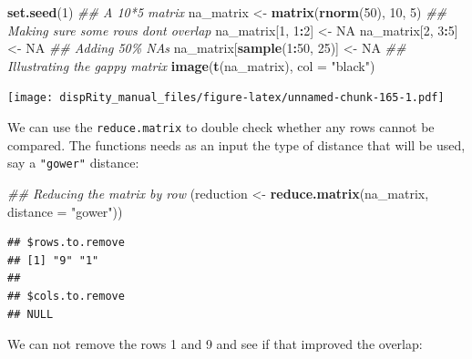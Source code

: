 \documentclass[
]{book}
\newenvironment{Shaded}{\begin{snugshade}}{\end{snugshade}}
\newcommand{\CommentTok}[1]{\textcolor[rgb]{0.56,0.35,0.01}{\textit{#1}}}
\newcommand{\DataTypeTok}[1]{\textcolor[rgb]{0.13,0.29,0.53}{#1}}
\newcommand{\DecValTok}[1]{\textcolor[rgb]{0.00,0.00,0.81}{#1}}
\newcommand{\KeywordTok}[1]{\textcolor[rgb]{0.13,0.29,0.53}{\textbf{#1}}}
\newcommand{\NormalTok}[1]{#1}
\newcommand{\OperatorTok}[1]{\textcolor[rgb]{0.81,0.36,0.00}{\textbf{#1}}}
\newcommand{\OtherTok}[1]{\textcolor[rgb]{0.56,0.35,0.01}{#1}}
\newcommand{\StringTok}[1]{\textcolor[rgb]{0.31,0.60,0.02}{#1}}
\begin{document}
\begin{Shaded}
\begin{Highlighting}[]
\KeywordTok{set.seed}\NormalTok{(}\DecValTok{1}\NormalTok{)}
\CommentTok{\#\# A 10*5 matrix}
\NormalTok{na\_matrix \textless{}{-}}\StringTok{ }\KeywordTok{matrix}\NormalTok{(}\KeywordTok{rnorm}\NormalTok{(}\DecValTok{50}\NormalTok{), }\DecValTok{10}\NormalTok{, }\DecValTok{5}\NormalTok{)}
\CommentTok{\#\# Making sure some rows don\textquotesingle{}t overlap}
\NormalTok{na\_matrix[}\DecValTok{1}\NormalTok{, }\DecValTok{1}\OperatorTok{:}\DecValTok{2}\NormalTok{] \textless{}{-}}\StringTok{ }\OtherTok{NA}
\NormalTok{na\_matrix[}\DecValTok{2}\NormalTok{, }\DecValTok{3}\OperatorTok{:}\DecValTok{5}\NormalTok{] \textless{}{-}}\StringTok{ }\OtherTok{NA}
\CommentTok{\#\# Adding 50\% NAs}
\NormalTok{na\_matrix[}\KeywordTok{sample}\NormalTok{(}\DecValTok{1}\OperatorTok{:}\DecValTok{50}\NormalTok{, }\DecValTok{25}\NormalTok{)] \textless{}{-}}\StringTok{ }\OtherTok{NA}
\CommentTok{\#\# Illustrating the gappy matrix}
\KeywordTok{image}\NormalTok{(}\KeywordTok{t}\NormalTok{(na\_matrix), }\DataTypeTok{col =} \StringTok{"black"}\NormalTok{)}
\end{Highlighting}
\end{Shaded}

\texttt{[image: dispRity\_manual\_files/figure-latex/unnamed-chunk-165-1.pdf]}

We can use the \texttt{reduce.matrix} to double check whether any rows cannot be compared.
The functions needs as an input the type of distance that will be used, say a \texttt{"gower"} distance:

\begin{Shaded}
\begin{Highlighting}[]
\CommentTok{\#\# Reducing the matrix by row}
\NormalTok{(reduction \textless{}{-}}\StringTok{ }\KeywordTok{reduce.matrix}\NormalTok{(na\_matrix, }\DataTypeTok{distance =} \StringTok{"gower"}\NormalTok{))}
\end{Highlighting}
\end{Shaded}

\begin{verbatim}
## $rows.to.remove
## [1] "9" "1"
## 
## $cols.to.remove
## NULL
\end{verbatim}

We can not remove the rows 1 and 9 and see if that improved the overlap:

\begin{Shaded}
\end{Shaded}
\end{document}
